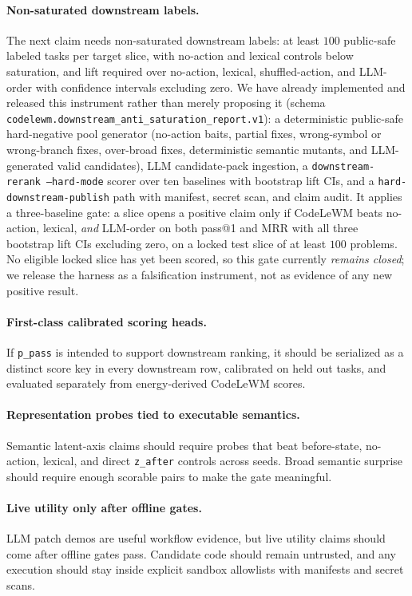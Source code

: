 \documentclass[11pt]{article}
\newcommand{\code}[1]{\texttt{#1}}
\newcommand{\modelname}{CodeLeWM}
\begin{document}
\paragraph{Non-saturated downstream labels.}
The next claim needs non-saturated downstream labels: at least $100$ public-safe
labeled tasks per target slice, with no-action and lexical controls below
saturation, and lift required over no-action, lexical, shuffled-action, and
LLM-order with confidence intervals excluding zero. We have already implemented
and released this instrument rather than merely proposing it (schema
\code{codelewm.downstream\_anti\_saturation\_report.v1}): a deterministic
public-safe hard-negative pool generator (no-action baits, partial fixes,
wrong-symbol or wrong-branch fixes, over-broad fixes, deterministic semantic
mutants, and LLM-generated valid candidates), LLM candidate-pack ingestion, a
\code{downstream-rerank}~\code{--hard-mode} scorer over ten baselines with
bootstrap lift CIs, and a \code{hard-downstream-publish} path with manifest,
secret scan, and claim audit. It applies a three-baseline gate: a slice opens a
positive claim only if \modelname{} beats no-action, lexical, \emph{and}
LLM-order on both pass@1 and MRR with all three bootstrap lift CIs excluding zero,
on a locked test slice of at least $100$ problems. No eligible locked slice has
yet been scored, so this gate currently \emph{remains closed}; we release the
harness as a falsification instrument, not as evidence of any new positive
result.

\paragraph{First-class calibrated scoring heads.}
If \code{p\_pass} is intended to support downstream ranking, it should be
serialized as a distinct score key in every downstream row, calibrated on held
out tasks, and evaluated separately from energy-derived CodeLeWM scores.

\paragraph{Representation probes tied to executable semantics.}
Semantic latent-axis claims should require probes that beat before-state,
no-action, lexical, and direct \code{z\_after} controls across seeds. Broad
semantic surprise should require enough scorable pairs to make the gate
meaningful.

\paragraph{Live utility only after offline gates.}
LLM patch demos are useful workflow evidence, but live utility claims should
come after offline gates pass. Candidate code should remain untrusted, and any
execution should stay inside explicit sandbox allowlists with manifests and
secret scans.
\end{document}
